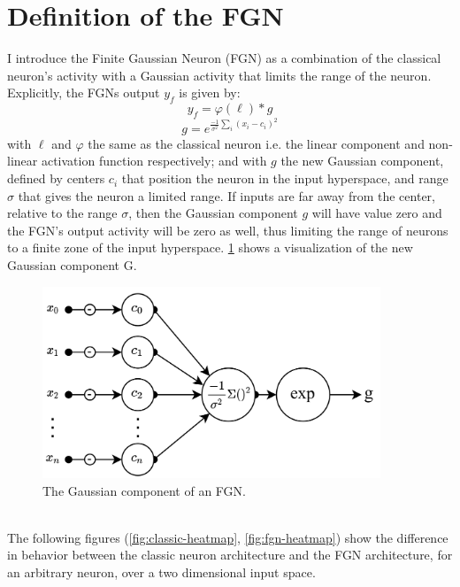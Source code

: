 \documentclass[12pt,oneside]{CUNY_PhD}
\begin{document}
\section{Definition of the FGN} \label{Definition of the Finite Gaussian Neuron}
I introduce the Finite Gaussian Neuron (FGN) as a combination of the classical neuron's activity with a Gaussian activity that limits the range of the neuron. Explicitly, the FGNs output $y_f$ is given by:
\[y_{f} = \varphi(\ell) * g\]
\[g = e^{\frac{-1}{\sigma^2}\sum_{i}(x_i-c_i)^2}\]
with $\ell$ and $\varphi$ the same as the classical neuron i.e. the linear component and non-linear activation function respectively; and with $g$ the new Gaussian component, defined by centers $c_i$ that position the neuron in the input hyperspace, and range $\sigma$ that gives the neuron a limited range. If inputs are far away from the center, relative to the range $\sigma$, then the Gaussian component $g$ will have value zero and the FGN's output activity will be zero as well, thus limiting the range of neurons to a finite zone of the input hyperspace. \ref{fig:gaussian-comp} shows a visualization of the new Gaussian component G.
\begin{figure}[!htbp]
    \centering
    \includegraphics[width=0.9\textwidth]{images/fgn-gaussian-component.png}
    \caption{The Gaussian component of an FGN.}
    \label{fig:gaussian-comp}
\end{figure}\\
The following figures (\ref{fig:classic-heatmap}, \ref{fig:fgn-heatmap}) show the difference in behavior between the classic neuron architecture and the FGN architecture, for an arbitrary neuron, over a two dimensional input space.
\end{document}
